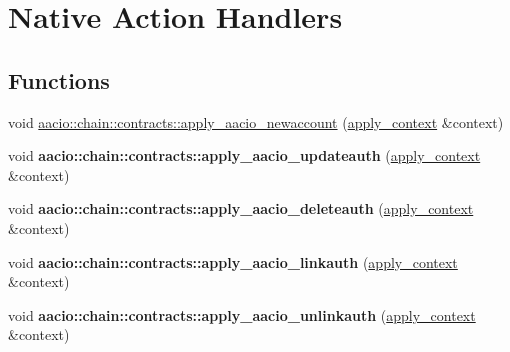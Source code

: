 \hypertarget{group__native__action__handlers}{}\section{Native Action Handlers}
\label{group__native__action__handlers}
\subsection*{Functions}
\begin{DoxyCompactItemize}
\item 
void \mbox{\hyperlink{group__native__action__handlers_ga494923d3597992d37753d77c03f572d5}{aacio\+::chain\+::contracts\+::apply\+\_\+aacio\+\_\+newaccount}} (\mbox{\hyperlink{classaacio_1_1chain_1_1apply__context}{apply\+\_\+context}} \&context)
\item 
\mbox{\label{group__native__action__handlers_ga50721f0949acaa0cb26e1cf39dff8f99}} 
void {\bfseries aacio\+::chain\+::contracts\+::apply\+\_\+aacio\+\_\+updateauth} (\mbox{\hyperlink{classaacio_1_1chain_1_1apply__context}{apply\+\_\+context}} \&context)
\item 
\mbox{\label{group__native__action__handlers_gacba73b2ca00aafc8b4308d86f9c1ab57}} 
void {\bfseries aacio\+::chain\+::contracts\+::apply\+\_\+aacio\+\_\+deleteauth} (\mbox{\hyperlink{classaacio_1_1chain_1_1apply__context}{apply\+\_\+context}} \&context)
\item 
\mbox{\label{group__native__action__handlers_gab4386f5bb9c2e2142081914efe6f2f27}} 
void {\bfseries aacio\+::chain\+::contracts\+::apply\+\_\+aacio\+\_\+linkauth} (\mbox{\hyperlink{classaacio_1_1chain_1_1apply__context}{apply\+\_\+context}} \&context)
\item 
\mbox{\label{group__native__action__handlers_ga674c65d53e5c3bf01bea5d5dec6cf467}} 
void {\bfseries aacio\+::chain\+::contracts\+::apply\+\_\+aacio\+\_\+unlinkauth} (\mbox{\hyperlink{classaacio_1_1chain_1_1apply__context}{apply\+\_\+context}} \&context)
\item 
\mbox{\label{group__native__action__handlers_ga62c3802abd584341ed53234bfceb08cf}} 

\end{DoxyCompactItemize}
